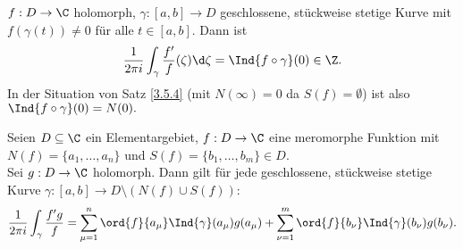 		\begin{cor}
			$ f: D \to \C $ holomorph, $ \gamma: [a,b] \to D $ geschlossene, stückweise stetige Kurve mit $ f(\gamma(t)) \neq 0 $ für alle $ t \in [a,b] $. Dann ist 
			\[ \frac{1}{2\pi i} \int_\gamma \frac{f'}{f} (\zeta)\d\zeta = \Ind{f \circ \gamma}(0) \in \Z. \]
			In der Situation von Satz \ref{3.5.4} (mit $N(\infty) = 0$ da $S(f) = \emptyset$) ist also $ \Ind{f \circ \gamma}(0) = N(0). $ 
		\end{cor}
		
		\begin{cor}
			Seien $D \subseteq \C$ ein Elementargebiet, $ f: D \to \C $ eine meromorphe Funktion mit $ N(f) = \{a_1,\dotsc,a_n\} $ und $ S(f) = \{b_1,\dotsc,b_m\} \in D $.\\
			Sei $ g: D \to \C $ holomorph. Dann gilt für jede geschlossene, stückweise stetige Kurve $ \gamma: [a,b] \to D \setminus (N(f) \cup S(f)): $
			\[ \frac{1}{2\pi i} \int_\gamma \frac{f' g}{f} = \sum_{\mu=1}^n \ord{f}{a_\mu} \Ind{\gamma}(a_\mu)g(a_\mu) + \sum_{\nu=1}^m \ord{f}{b_\nu} \Ind{\gamma}(b_\nu)g(b_\nu). \]
		\end{cor}